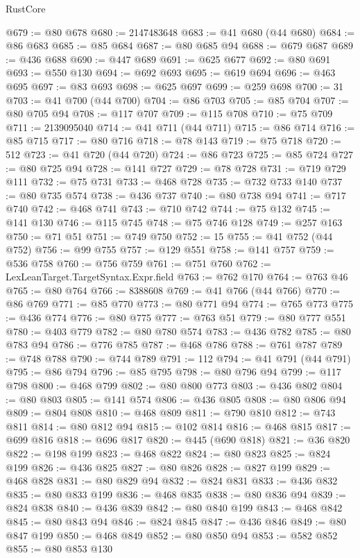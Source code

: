 \begin{lexlean}{RustCore}
\begin{coremodule}
@679 := @80 @678
@680 := 2147483648
@683 := @41 @680 (@44 @680)
@684 := @86 @683
@685 := @85 @684
@687 := @80 @685 @94
@688 := @679 @687
@689 := @436 @688
@690 := @447 @689
@691 := @625 @677
@692 := @80 @691
@693 := @550 @130
@694 := @692 @693
@695 := @619 @694
@696 := @463 @695
@697 := @83 @693
@698 := @625 @697
@699 := @259 @698
@700 := 31
@703 := @41 @700 (@44 @700)
@704 := @86 @703
@705 := @85 @704
@707 := @80 @705 @94
@708 := @117 @707
@709 := @115 @708
@710 := @75 @709
@711 := 2139095040
@714 := @41 @711 (@44 @711)
@715 := @86 @714
@716 := @85 @715
@717 := @80 @716
@718 := @78 @143
@719 := @75 @718
@720 := 512
@723 := @41 @720 (@44 @720)
@724 := @86 @723
@725 := @85 @724
@727 := @80 @725 @94
@728 := @141 @727
@729 := @78 @728
@731 := @719 @729 @111
@732 := @75 @731
@733 := @468 @728
@735 := @732 @733 @140
@737 := @80 @735 @574
@738 := @436 @737
@740 := @80 @738 @94
@741 := @717 @740
@742 := @468 @741
@743 := @710 @742
@744 := @75 @132
@745 := @141 @130
@746 := @115 @745
@748 := @75 @746 @128
@749 := @257 @163
@750 := @71 @51
@751 := @749 @750
@752 := 15
@755 := @41 @752 (@44 @752)
@756 := @99 @755
@757 := @129 @551
@758 := @141 @757
@759 := @536 @758
@760 := @756 @759
@761 := @751 @760
@762 := LexLeanTarget.TargetSyntax.Expr.field
@763 := @762 @170
@764 := @763 @46
@765 := @80 @764
@766 := 8388608
@769 := @41 @766 (@44 @766)
@770 := @86 @769
@771 := @85 @770
@773 := @80 @771 @94
@774 := @765 @773
@775 := @436 @774
@776 := @80 @775
@777 := @763 @51
@779 := @80 @777 @551
@780 := @403 @779
@782 := @80 @780 @574
@783 := @436 @782
@785 := @80 @783 @94
@786 := @776 @785
@787 := @468 @786
@788 := @761 @787
@789 := @748 @788
@790 := @744 @789
@791 := 112
@794 := @41 @791 (@44 @791)
@795 := @86 @794
@796 := @85 @795
@798 := @80 @796 @94
@799 := @117 @798
@800 := @468 @799
@802 := @80 @800 @773
@803 := @436 @802
@804 := @80 @803
@805 := @141 @574
@806 := @436 @805
@808 := @80 @806 @94
@809 := @804 @808
@810 := @468 @809
@811 := @790 @810
@812 := @743 @811
@814 := @80 @812 @94
@815 := @102 @814
@816 := @468 @815
@817 := @699 @816
@818 := @696 @817
@820 := @445 (@690 @818)
@821 := @36 @820
@822 := @198 @199
@823 := @468 @822
@824 := @80 @823
@825 := @824 @199
@826 := @436 @825
@827 := @80 @826
@828 := @827 @199
@829 := @468 @828
@831 := @80 @829 @94
@832 := @824 @831
@833 := @436 @832
@835 := @80 @833 @199
@836 := @468 @835
@838 := @80 @836 @94
@839 := @824 @838
@840 := @436 @839
@842 := @80 @840 @199
@843 := @468 @842
@845 := @80 @843 @94
@846 := @824 @845
@847 := @436 @846
@849 := @80 @847 @199
@850 := @468 @849
@852 := @80 @850 @94
@853 := @582 @852
@855 := @80 @853 @130

\end{coremodule}
\end{lexlean}
